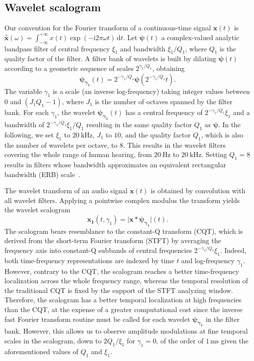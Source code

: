 \documentclass[smallextended]{svjour3}
\begin{document}
\subsection{Wavelet scalogram}
Our convention for the Fourier transform of a continuous-time signal $\boldsymbol{x}(t)$ is $\boldsymbol{\hat{x}}(\omega) = \int_{-\infty}^{+\infty} x(t) \exp(- \mathrm{i} 2\pi \omega t) \, \mathrm{d}t$.
Let $\boldsymbol{\psi}(t)$ a complex-valued analytic bandpass filter of
central frequency $\xi_1$ and bandwidth $\xi_1/Q_1$, where $Q_1$ is the quality factor of the filter.
A filter bank of wavelets is built by dilating $\boldsymbol{\psi}(t)$
according to a geometric sequence of scales $2^{\gamma_1/Q_1}$, obtaining
\begin{equation}
\boldsymbol{\psi_{\gamma_1}}(t) = 2^{-\gamma_1/Q_1} \boldsymbol{\psi}(2^{-\gamma_1/Q_1} t)\mbox{.}
\end{equation}
The variable $\gamma_1$ is a scale (an inverse log-frequency) taking integer values between $0$ and $(J_1 Q_1 - 1)$, where $J_1$ is the number of octaves spanned by the filter bank.
For each $\gamma_1$, the wavelet $\boldsymbol{\psi_{\gamma_1}}(t)$
has a central frequency of $2^{-\gamma_1/Q_1}\xi_1$ and a bandwidth of $2^{-\gamma_1/Q_1}\xi_1/Q_1$ resulting in the same quality factor $Q_1$ as $\boldsymbol{\psi}$.
In the following, we set $\xi_1$ to $20~\mathrm{kHz}$, $J_1$ to $10$, and the quality factor $Q_1$, which is also the number of wavelets per octave, to $8$. This results in the wavelet filters covering the whole range of human hearing, from $20~\mathrm{Hz}$ to $20~\mathrm{kHz}$. Setting $Q_1 = 8$ results in filters whose bandwidth approximates an equivalent rectangular bandwidth (ERB) scale~\cite{Fastl2007}.

The wavelet transform of an audio signal
$\boldsymbol{x}(t)$ is obtained by convolution with all wavelet filters.
Applying a pointwise complex modulus the transform yields
the wavelet scalogram
\begin{equation}
\boldsymbol{x_1}(t, \gamma_1)
= \vert \boldsymbol{x} \ast \boldsymbol{\psi_{\gamma_1}} \vert (t)\mbox{.}
\end{equation}
The scalogram bears resemblance to the constant-Q transform (CQT),
which is derived from the short-term Fourier transform (STFT) by averaging the frequency
axis into constant-Q subbands of central frequencies $2^{-\gamma_1/Q_1}\xi_1$.
Indeed, both time-frequency representations are indexed by time $t$ and log-frequency $\gamma_1$.
However, contrary to the CQT, the scalogram reaches a better time-frequency localization across the whole
frequency range, whereas the temporal resolution of the traditional CQT is fixed by the support of the STFT analyzing window. %
Therefore, the scalogram has a better temporal localization at high
frequencies than the CQT, at the expense of a greater computational cost
since the inverse fast Fourier transform routine must be called for each wavelet $\boldsymbol{\psi_{\gamma_1}}$ in the filter bank.
However, this allows us to observe amplitude modulations at fine temporal scales in the scalogram, down to $2Q_1/\xi_1$ for $\gamma_1 = 0$, of the order of $1\,\textrm{ms}$ given the aforementioned values of $Q_1$ and $\xi_1$.
\end{document}

